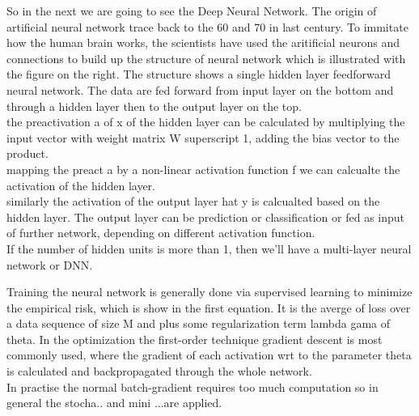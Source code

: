 \begin{frame}
 So in the next we are going to see the Deep Neural Network. The origin of artificial neural network trace back to the 60 and 70 in last century. To immitate how the human brain works, the scientists have used the aritificial neurons and connections to build up the structure of neural network which is illustrated with the figure on the right. The structure shows a single hidden layer feedforward neural network. The data are fed forward from input layer on the bottom and through a hidden layer then to the output layer on the top. \\
 
 the preactivation a of x of the hidden layer can be calculated by multiplying the input vector with weight matrix W superscript 1, adding the bias vector to the product. \\
 
 mapping the preact a  by a non-linear activation function f we can calcualte the activation of the hidden layer. \\
 
 similarly the activation of the output layer hat y is calcualted based on the hidden layer. The output layer can be prediction or classification or fed as input of further network, depending on different activation function. \\
 
 If the number of hidden units is more than 1, then we'll have a multi-layer neural network or DNN.
\end{frame}
\begin{frame}
 Training the neural network is generally done via supervised learning to minimize the empirical risk, which is show in the first equation. It is the averge of loss over a data sequence of size M and plus some regularization term lambda gama of theta. 
 In the optimization the first-order technique gradient descent is most commonly used, where the gradient of each activation wrt to the parameter theta is calculated and backpropagated through the whole network. \\
 In practise the normal batch-gradient requires too much computation so in general the stocha.. and mini ...are applied.
\end{frame}

